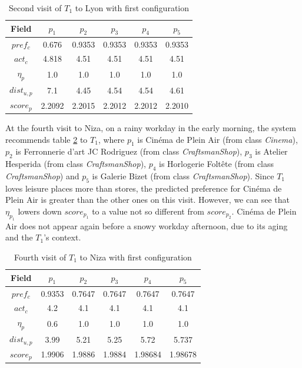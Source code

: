 \begin{table}[h!]
    \centering
    \begin{tabular}{ |c|c|c|c|c|c| } 
        \hline
        Field   & $p_1$ & $p_2$ & $p_3$ & $p_4$ & $p_5$ \\
        \hline
        $pref_c$    & 0.676 & 0.9353 & 0.9353 & 0.9353 & 0.9353 \\
        $act_c$     & 4.818 & 4.51 & 4.51 & 4.51 & 4.51 \\
        $\eta_p$    & 1.0 & 1.0 & 1.0 & 1.0 & 1.0 \\
        $dist_{u,p}$ & 7.1 & 4.45 & 4.54 & 4.54 & 4.61 \\
        $score_p$    & 2.2092 & 2.2015 & 2.2012 & 2.2012 & 2.2010 \\
        
        \hline
    \end{tabular}
    \caption{Second visit of $T_1$ to Lyon with first configuration}
    \label{table:t1-3}
\end{table}

At the fourth visit to Niza, on a rainy workday in the early morning, the system recommends table \ref{table:t1-2} to $T_1$, where $p_1$ is Cinéma de Plein Air (from class \textit{Cinema}), $p_2$ is Ferronnerie d'art JC Rodriguez (from class \textit{CraftsmanShop}), $p_3$ is Atelier Hesperida (from class \textit{CraftsmanShop}), $p_4$ is Horlogerie Foltête	(from class \textit{CraftsmanShop}) and $p_5$ is Galerie Bizet (from class \textit{CraftsmanShop}). Since $T_1$ loves leisure places more than stores, the predicted preference for Cinéma de Plein Air is greater than the other ones on this visit. However, we can see that $\eta_{p_1}$ lowers down $score_{p_1}$ to a value not so different from $score_{p_2}$. Cinéma de Plein Air does not appear again before a snowy workday afternoon, due to its aging and the $T_1$'s context.

\begin{table}[h!]
    \centering
    \begin{tabular}{ |c|c|c|c|c|c| } 
        \hline
        Field   & $p_1$ & $p_2$ & $p_3$ & $p_4$ & $p_5$ \\
        \hline
        $pref_c$    &  0.9353 & 0.7647 & 0.7647 & 0.7647 & 0.7647 \\
        $act_c$     & 4.2 & 4.1 & 4.1 & 4.1 & 4.1 \\
        $\eta_p$    & 0.6 & 1.0 & 1.0 & 1.0 & 1.0 \\
        $dist_{u,p}$ & 3.99 & 5.21 & 5.25 & 5.72 & 5.737 \\
        $score_p$    & 1.9906 & 1.9886 & 1.9884 & 1.98684 & 1.98678 \\
        
        \hline
    \end{tabular}
    \caption{Fourth visit of $T_1$ to Niza with first configuration}
    \label{table:t1-2}
\end{table}

